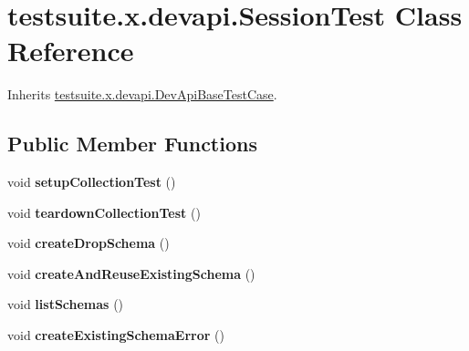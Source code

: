 \hypertarget{classtestsuite_1_1x_1_1devapi_1_1_session_test}{}\section{testsuite.\+x.\+devapi.\+Session\+Test Class Reference}
\label{classtestsuite_1_1x_1_1devapi_1_1_session_test}


Inherits \mbox{\hyperlink{classtestsuite_1_1x_1_1devapi_1_1_dev_api_base_test_case}{testsuite.\+x.\+devapi.\+Dev\+Api\+Base\+Test\+Case}}.

\subsection*{Public Member Functions}
\begin{DoxyCompactItemize}
\item 
\mbox{\label{classtestsuite_1_1x_1_1devapi_1_1_session_test_a85145a0b3215643d2fb344eb9bc37d2d}} 
void {\bfseries setup\+Collection\+Test} ()
\item 
\mbox{\label{classtestsuite_1_1x_1_1devapi_1_1_session_test_a9c0c683b3042fb53123c360b76cef62e}} 
void {\bfseries teardown\+Collection\+Test} ()
\item 
\mbox{\label{classtestsuite_1_1x_1_1devapi_1_1_session_test_a39b14a2de73d19f99f150480040c31c5}} 
void {\bfseries create\+Drop\+Schema} ()
\item 
\mbox{\label{classtestsuite_1_1x_1_1devapi_1_1_session_test_a86f3f9ee309faba5c7fcd471fb828550}} 
void {\bfseries create\+And\+Reuse\+Existing\+Schema} ()
\item 
\mbox{\label{classtestsuite_1_1x_1_1devapi_1_1_session_test_afc0d9ee6ae02e55d05e9a241ff362e6d}} 
void {\bfseries list\+Schemas} ()
\item 
\mbox{\label{classtestsuite_1_1x_1_1devapi_1_1_session_test_a73edaeff96b813c2f2ac89bb1fe51a0b}} 
void {\bfseries create\+Existing\+Schema\+Error} ()

\end{DoxyCompactItemize}
